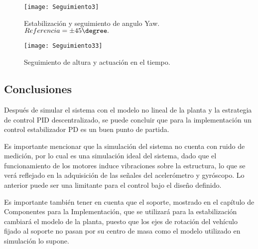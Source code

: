 \documentclass[\main/main.tex]{subfiles}
\begin{document}
\begin{figure}[H]
\noindent \begin{centering}
\texttt{[image: Seguimiento3]}
\par\end{centering}
\caption{Estabilización y seguimiento de angulo Yaw. $Referencia=\pm45\degree.$}
\end{figure}

\begin{figure}[H]
\noindent \begin{centering}
\texttt{[image: Seguimiento33]}
\par\end{centering}
\caption{Seguimiento de altura y actuación en el tiempo.}
\end{figure}

\subsection{Conclusiones}

Después de simular el sistema con el modelo no lineal de la planta y la
estrategia de control PID descentralizado, se puede concluir que
para la implementación un control estabilizador PD es un buen punto
de partida.

Es importante mencionar que la simulación del sistema no cuenta con
ruido de medición, por lo cual es una simulación ideal del sistema,
dado que el funcionamiento de los motores induce vibraciones sobre
la estructura, lo que se verá reflejado en la adquisición de las señales
del acelerómetro y gyróscopo. Lo anterior puede ser una limitante
para el control bajo el diseño definido.

Es importante también tener en cuenta que el soporte, mostrado en el capítulo de Componentes para la Implementación, que se utilizará
para la estabilización cambiará el modelo de la planta, puesto que
los ejes de rotación del vehículo fijado al soporte no pasan por su
centro de masa como el modelo utilizado en simulación lo supone.
\end{document}
